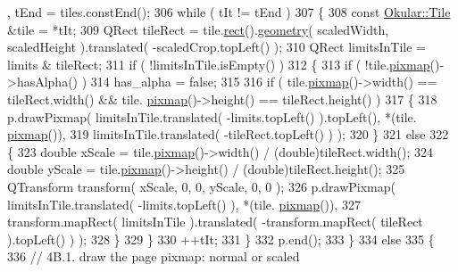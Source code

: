 \begin{DoxyCode}
      , tEnd = tiles.constEnd();
306             \textcolor{keywordflow}{while} ( tIt != tEnd )
307             \{
308                 \textcolor{keyword}{const} \hyperlink{classOkular_1_1Tile}{Okular::Tile} &tile = *tIt;
309                 QRect tileRect = tile.\hyperlink{classOkular_1_1Tile_af98992ebbaa390a12a942bff6c246fca}{rect}().\hyperlink{classOkular_1_1NormalizedRect_a006897c5fcff2c3a97b4141f1a967513}{geometry}( scaledWidth, scaledHeight ).translated( 
      -scaledCrop.topLeft() );
310                 QRect limitsInTile = limits & tileRect;
311                 \textcolor{keywordflow}{if} ( !limitsInTile.isEmpty() )
312                 \{
313                     \textcolor{keywordflow}{if} ( !tile.\hyperlink{classOkular_1_1Tile_ad20431332cb0fb2844fa2238cc728a9f}{pixmap}()->hasAlpha() )
314                         has\_alpha = \textcolor{keyword}{false};
315 
316                     \textcolor{keywordflow}{if} ( tile.\hyperlink{classOkular_1_1Tile_ad20431332cb0fb2844fa2238cc728a9f}{pixmap}()->width() == tileRect.width() && tile.
      \hyperlink{classOkular_1_1Tile_ad20431332cb0fb2844fa2238cc728a9f}{pixmap}()->height() == tileRect.height() )
317                     \{
318                         p.drawPixmap( limitsInTile.translated( -limits.topLeft() ).topLeft(), *(tile.
      \hyperlink{classOkular_1_1Tile_ad20431332cb0fb2844fa2238cc728a9f}{pixmap}()),
319                                 limitsInTile.translated( -tileRect.topLeft() ) );
320                     \}
321                     \textcolor{keywordflow}{else}
322                     \{
323                         \textcolor{keywordtype}{double} xScale = tile.\hyperlink{classOkular_1_1Tile_ad20431332cb0fb2844fa2238cc728a9f}{pixmap}()->width() / (double)tileRect.width();
324                         \textcolor{keywordtype}{double} yScale = tile.\hyperlink{classOkular_1_1Tile_ad20431332cb0fb2844fa2238cc728a9f}{pixmap}()->height() / (double)tileRect.height();
325                         QTransform transform( xScale, 0, 0, yScale, 0, 0 );
326                         p.drawPixmap( limitsInTile.translated( -limits.topLeft() ), *(tile.
      \hyperlink{classOkular_1_1Tile_ad20431332cb0fb2844fa2238cc728a9f}{pixmap}()),
327                                 transform.mapRect( limitsInTile ).translated( -transform.mapRect( tileRect 
      ).topLeft() ) );
328                     \}
329                 \}
330                 ++tIt;
331             \}
332             p.end();
333         \}
334         \textcolor{keywordflow}{else}
335         \{
336             \textcolor{comment}{// 4B.1. draw the page pixmap: normal or scaled}

\end{DoxyCode}
